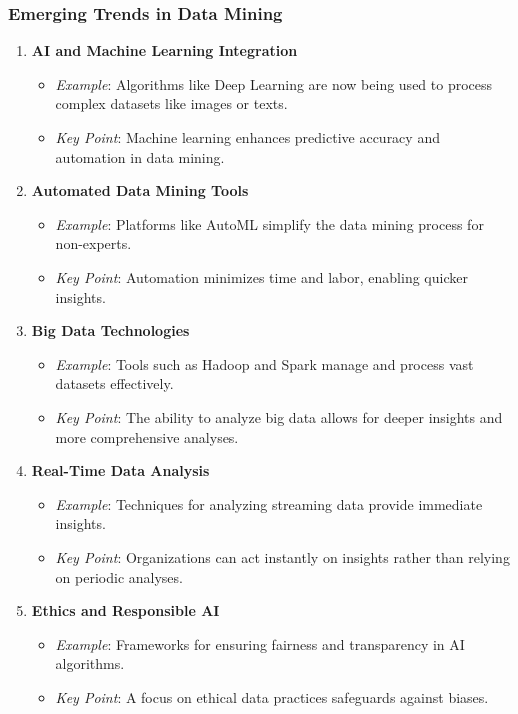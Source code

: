 \documentclass{beamer}
\begin{document}
\begin{frame}[fragile]
    \frametitle{Emerging Trends in Data Mining}
    \begin{enumerate}
        \item \textbf{AI and Machine Learning Integration}
        \begin{itemize}
            \item \textit{Example}: Algorithms like Deep Learning are now being used to process complex datasets like images or texts.
            \item \textit{Key Point}: Machine learning enhances predictive accuracy and automation in data mining.
        \end{itemize}

        \item \textbf{Automated Data Mining Tools}
        \begin{itemize}
            \item \textit{Example}: Platforms like AutoML simplify the data mining process for non-experts.
            \item \textit{Key Point}: Automation minimizes time and labor, enabling quicker insights.
        \end{itemize}

        \item \textbf{Big Data Technologies}
        \begin{itemize}
            \item \textit{Example}: Tools such as Hadoop and Spark manage and process vast datasets effectively.
            \item \textit{Key Point}: The ability to analyze big data allows for deeper insights and more comprehensive analyses.
        \end{itemize}

        \item \textbf{Real-Time Data Analysis}
        \begin{itemize}
            \item \textit{Example}: Techniques for analyzing streaming data provide immediate insights.
            \item \textit{Key Point}: Organizations can act instantly on insights rather than relying on periodic analyses.
        \end{itemize}

        \item \textbf{Ethics and Responsible AI}
        \begin{itemize}
            \item \textit{Example}: Frameworks for ensuring fairness and transparency in AI algorithms.
            \item \textit{Key Point}: A focus on ethical data practices safeguards against biases.
        \end{itemize}
    \end{enumerate}
\end{frame}
\end{document}
